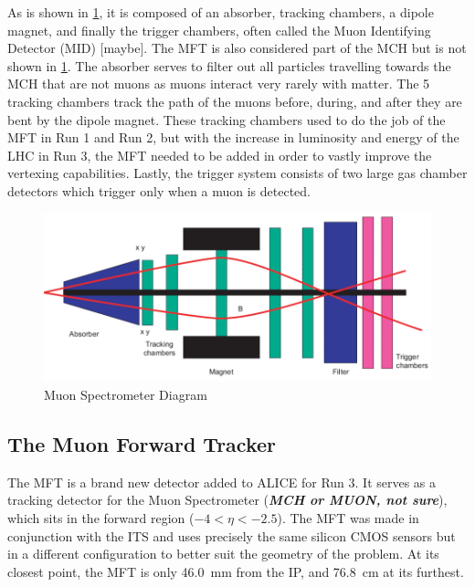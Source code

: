 \documentclass[11pt]{article}
\numberwithin{equation}{section}
\numberwithin{figure}{section}
\numberwithin{table}{section}
\begin{document}
As is shown in \cref{fig:Muon Spectrometer}, it is composed of an absorber, tracking chambers, a dipole magnet, and finally the trigger chambers, often called the Muon Identifying Detector (MID) [maybe]. The MFT is also considered part of the MCH but is not shown in \cref{fig:Muon Spectrometer}. The absorber serves to filter out all particles travelling towards the MCH that are not muons as muons interact very rarely with matter. The 5 tracking chambers track the path of the muons before, during, and after they are bent by the dipole magnet. These tracking chambers used to do the job of the MFT in Run 1 and Run 2, but with the increase in luminosity and energy of the LHC in Run 3, the MFT needed to be added in order to vastly improve the vertexing capabilities. Lastly, the trigger system consists of two large gas chamber detectors which trigger only when a muon is detected.

\begin{figure}[h]
    \begin{center}
        \includegraphics[width=\textwidth]{Figs/MCH_schematic.png}
        \caption{Muon Spectrometer Diagram \cite{Muon_Spec_Schematic}}
        \label{fig:Muon Spectrometer}
    \end{center}
\end{figure}

\subsection{The Muon Forward Tracker}
The MFT is a brand new detector added to ALICE for Run 3. It serves as a tracking detector for the Muon Spectrometer (\textit{\textbf{MCH or MUON, not sure}}), which sits in the forward region ($-4<\eta<-2.5$). The MFT was made in conjunction with the ITS and uses precisely the same silicon CMOS sensors but in a different configuration to better suit the geometry of the problem. At its closest point, the MFT is only \SI{46.0}{\milli\metre} from the IP, and \SI{76.8}{\centi\metre} at its furthest. 
\end{document}
